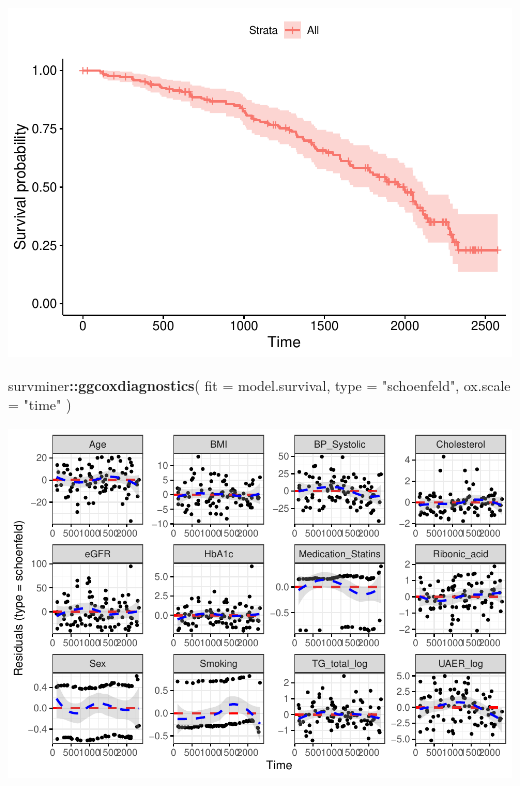 \documentclass[]{article}
\newenvironment{Shaded}{\begin{snugshade}}{\end{snugshade}}
\newcommand{\DataTypeTok}[1]{\textcolor[rgb]{0.13,0.29,0.53}{#1}}
\newcommand{\KeywordTok}[1]{\textcolor[rgb]{0.13,0.29,0.53}{\textbf{#1}}}
\newcommand{\NormalTok}[1]{#1}
\newcommand{\OperatorTok}[1]{\textcolor[rgb]{0.81,0.36,0.00}{\textbf{#1}}}
\newcommand{\StringTok}[1]{\textcolor[rgb]{0.31,0.60,0.02}{#1}}
\begin{document}
\includegraphics{0033_PROFIL--Metabolomics_files/figure-latex/RA-Matched-Mortality-Adjusted-Diagnostics-1.pdf}

\begin{Shaded}
\begin{Highlighting}[]
\NormalTok{survminer}\OperatorTok{::}\KeywordTok{ggcoxdiagnostics}\NormalTok{(}
  \DataTypeTok{fit =}\NormalTok{ model.survival, }
  \DataTypeTok{type =} \StringTok{"schoenfeld"}\NormalTok{, }
  \DataTypeTok{ox.scale =} \StringTok{"time"}
\NormalTok{)}
\end{Highlighting}
\end{Shaded}

\includegraphics{0033_PROFIL--Metabolomics_files/figure-latex/RA-Matched-Mortality-Adjusted-Diagnostics-2.pdf}

\newpage
\end{document}

